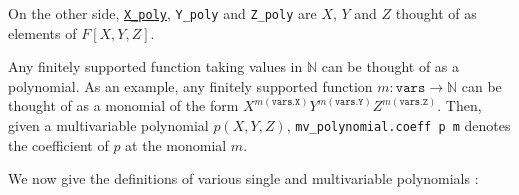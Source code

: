\documentclass{article}
\theoremstyle{definition}
\theoremstyle{remark}
\begin{document}
On the other side, \href{https://github.com/BoltonBailey/formal-snarks-project/blob/7fd9cd122f5887f88f6a706b4f2a68a7153c7381/src/snarks/babysnark/knowledge_soundness.lean#L145}{\texttt{X\_poly}}, \texttt{Y\_poly} and 
\texttt{Z\_poly} are $X$, $Y$ and $Z$ thought of as elements of $F[X, Y, Z]$.

Any finitely supported function taking values in $\mathbb{N}$ can be thought of as a polynomial. As an example, any finitely supported function 
$m : \texttt{vars} \to \mathbb{N}$ can be thought of as a monomial of the form $X^{m(\texttt{vars.X})} Y^{m(\texttt{vars.Y})} Z^{m(\texttt{vars.Z})}$. Then, 
given a multivariable polynomial $p(X, Y, Z)$, \texttt{mv\_polynomial.coeff p m} denotes the coefficient of $p$ at the monomial $m$.

We now give the definitions of various single and multivariable polynomials :
\end{document}

